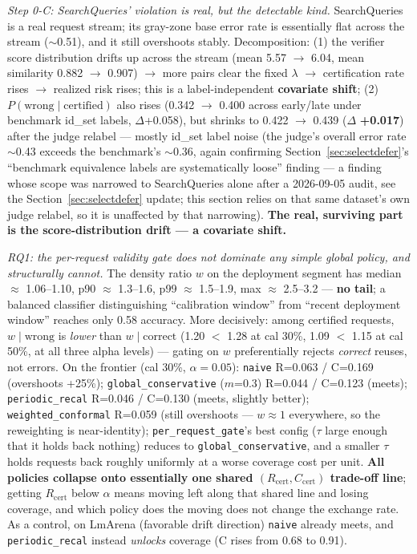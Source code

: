 \documentclass[11pt]{article}
\begin{document}
\emph{Step 0-C: SearchQueries' violation is real, but the detectable kind.} SearchQueries is a real request stream; its gray-zone base error rate is essentially flat across the stream ($\sim$0.51), and it still overshoots stably. Decomposition: (1) the verifier score distribution drifts up across the stream (mean 5.57 $\to$ 6.04, mean similarity 0.882 $\to$ 0.907) $\to$ more pairs clear the fixed $\lambda$ $\to$ certification rate rises $\to$ realized risk rises; this is a label-independent \textbf{covariate shift}; (2) $P(\text{wrong} \mid \text{certified})$ also rises (0.342 $\to$ 0.400 across early/late under benchmark id\_set labels, $\Delta$+0.058), but shrinks to 0.422 $\to$ 0.439 ($\Delta$ \textbf{+0.017}) after the judge relabel --- mostly id\_set label noise (the judge's overall error rate $\sim$0.43 exceeds the benchmark's $\sim$0.36, again confirming Section~\ref{sec:selectdefer}'s ``benchmark equivalence labels are systematically loose'' finding --- a finding whose scope was narrowed to SearchQueries alone after a 2026-09-05 audit, see the Section~\ref{sec:selectdefer} update; this section relies on that same dataset's own judge relabel, so it is unaffected by that narrowing). \textbf{The real, surviving part is the score-distribution drift --- a covariate shift.}

\emph{RQ1: the per-request validity gate does not dominate any simple global policy, and structurally cannot.} The density ratio $w$ on the deployment segment has median $\approx$ 1.06--1.10, p90 $\approx$ 1.3--1.6, p99 $\approx$ 1.5--1.9, max $\approx$ 2.5--3.2 --- \textbf{no tail}; a balanced classifier distinguishing ``calibration window'' from ``recent deployment window'' reaches only 0.58 accuracy. More decisively: among certified requests, $w \mid \text{wrong}$ is \emph{lower} than $w \mid \text{correct}$ (1.20 $<$ 1.28 at cal 30\%, 1.09 $<$ 1.15 at cal 50\%, at all three alpha levels) --- gating on $w$ preferentially rejects \emph{correct} reuses, not errors. On the frontier (cal 30\%, $\alpha=0.05$): \texttt{naive} R=0.063 / C=0.169 (overshoots +25\%); \texttt{global\_\allowbreak{}conservative} ($m$=0.3) R=0.044 / C=0.123 (meets); \texttt{periodic\_\allowbreak{}recal} R=0.046 / C=0.130 (meets, slightly better); \texttt{weighted\_\allowbreak{}conformal} R=0.059 (still overshoots --- $w \approx 1$ everywhere, so the reweighting is near-identity); \texttt{per\_\allowbreak{}request\_\allowbreak{}gate}'s best config ($\tau$ large enough that it holds back nothing) reduces to \texttt{global\_\allowbreak{}conservative}, and a smaller $\tau$ holds requests back roughly uniformly at a worse coverage cost per unit. \textbf{All policies collapse onto essentially one shared $(R_\text{cert}, C_\text{cert})$ trade-off line}; getting $R_\text{cert}$ below $\alpha$ means moving left along that shared line and losing coverage, and which policy does the moving does not change the exchange rate. As a control, on LmArena (favorable drift direction) \texttt{naive} already meets, and \texttt{periodic\_\allowbreak{}recal} instead \emph{unlocks} coverage (C rises from 0.68 to 0.91).
\end{document}
